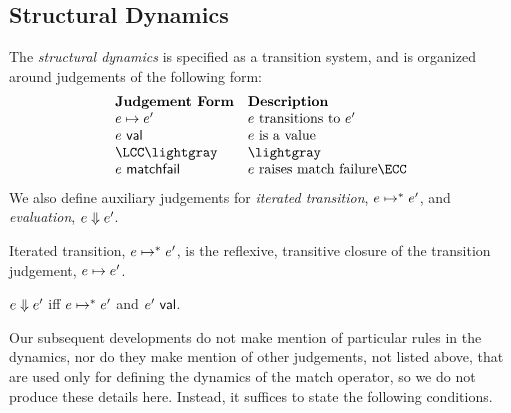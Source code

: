 \subsection{Structural Dynamics}\vspace{-4px}
The \emph{structural dynamics} is specified as a transition system, and is organized around judgements of the following form:
\vspace{-4px}\[\begin{array}{ll}
\textbf{Judgement Form} & \textbf{Description}\\
\stepsU{e}{e'} & \text{$e$ transitions to $e'$}\\
\isvalU{e} & \text{$e$ is a value}\\
\LCC \lightgray & \lightgray \\
\matchfail{e} & \text{$e$ raises match failure} \ECC
\end{array}\]\vspace{-4px}
We also define auxiliary judgements for \emph{iterated transition}, $e \mapsto^{*} e'$, and \emph{evaluation}, $e \Downarrow e'$.


\begin{definition}\label{defn:iterated-transition-UP} Iterated transition, $e \mapsto^{*} e'$, is the reflexive, transitive closure of the transition judgement, $e \mapsto e'$.\end{definition}


\begin{definition}[Evaluation]\label{defn:evaluation-UP}  $e \Downarrow e'$ iff $e \mapsto^{*} e'$ and $e'~\mathsf{val}$. \end{definition}

Our subsequent developments do not make mention of particular rules in the dynamics, nor do they make mention of other judgements, not listed above,  that are used only for defining the dynamics of the match operator, so we do not produce these details here. Instead, it suffices to state the following conditions.

